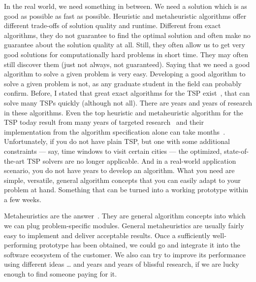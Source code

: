 In the real world, we need something in between.
We need a solution which is as good as possible as fast as possible.
Heuristic and metaheuristic algorithms offer different trade-offs of solution quality and runtime.
Different from exact algorithms, they do not guarantee to find the optimal solution and often make no guarantee about the solution quality at all.
Still, they often allow us to get very good solutions for computationally hard problems in short time.
They may often still discover them (just not always, not guaranteed).%
\endhsection%
%
%
%
Saying that we need a good algorithm to solve a given problem is very easy.
Developing a good algorithm to solve a given problem is not, as any graduate student in the field can probably confirm.
Before, I stated that great exact algorithms for the TSP exist~\cite{CEG2007CWDPIFTSPT,C2021WT}, that can solve many TSPs quickly (although not all).
There are years and years of research in these algorithms.
Even the top heuristic and metaheuristic algorithm for the TSP today result from many years of targeted research~\cite{H2009GKOSFTLKTH,NK2013APGAUEACFTTSP,W2016BNMDPCADIM} and their implementation from the algorithm specification alone can take months~\cite{WWLC2019IIIOADTM}.
Unfortunately, if you do not have plain TSP, but one with some additional constraints --- say, time windows to visit certain cities --- the optimized, state-of-the-art TSP solvers are no longer applicable.
And in a real-world application scenario, you do not have years to develop an algorithm.
What you need are simple, versatile, general algorithm concepts that you can easily adapt to your problem at hand.
Something that can be turned into a working prototype within a few weeks.

Metaheuristics are the answer~\cite{W2009GOATAA,MF2004HTSIMH}.
They are general algorithm concepts into which we can plug problem-specific modules.
General metaheuristics are usually fairly easy to implement and deliver acceptable results.
Once a sufficiently well-performing prototype has been obtained, we could go and integrate it into the software ecosystem of the customer.
We also can try to improve its performance using different ideas {\dots} and years and years of blissful research, if we are lucky enough to find someone paying for it.%
\endhsection%
\endhsection%
%

